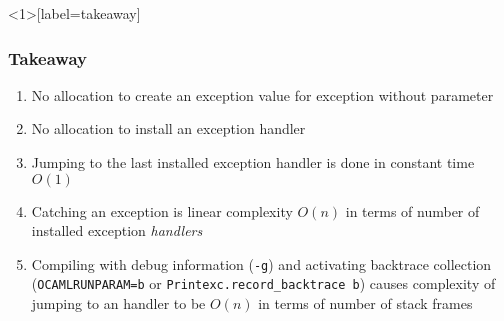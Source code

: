 \begin{frame}<1>[label=takeaway]
\frametitle{Takeaway}
\begin{enumerate}
\item<1-> No allocation to create an exception value for exception without parameter
\item<2-> No allocation to install an exception handler
\item<3-> Jumping to the last installed exception handler is done in constant time $O(1)$
\item<4-> Catching an exception is linear complexity $O(n)$ in terms of number of installed exception \emph{handlers}
\item<5-> \hypertarget<5->{bt-collection}{} Compiling with debug information (\texttt{-g}) and activating backtrace collection (\texttt{OCAMLRUNPARAM=b} or \texttt{Printexc.record_backtrace b}) causes complexity of jumping to an handler to be $O(n)$ in terms of number of stack frames
\end{enumerate}
\end{frame}
